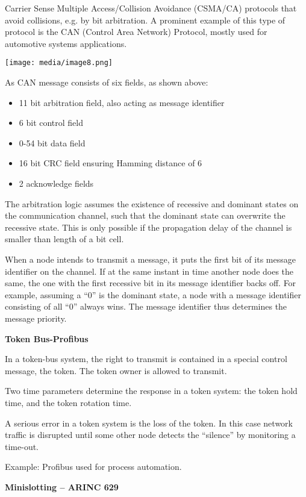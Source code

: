 Carrier Sense Multiple Access/Collision Avoidance (CSMA/CA) protocols
that avoid collisions, e.g. by bit arbitration. A prominent example of
this type of protocol is the CAN (Control Area Network) Protocol, mostly
used for automotive systems applications.

\texttt{[image: media/image8.png]}

As CAN message consists of six fields, as shown above:

\begin{itemize}
\item
  11 bit arbitration field, also acting as message identifier
\item
  6 bit control field
\item
  0-54 bit data field
\item
  16 bit CRC field ensuring Hamming distance of 6
\item
  2 acknowledge fields
\end{itemize}

The arbitration logic assumes the existence of recessive and dominant
states on the communication channel, such that the dominant state can
overwrite the recessive state. This is only possible if the propagation
delay of the channel is smaller than length of a bit cell.

When a node intends to transmit a message, it puts the first bit of its
message identifier on the channel. If at the same instant in time
another node does the same, the one with the first recessive bit in its
message identifier backs off. For example, assuming a ``0'' is the
dominant state, a node with a message identifier consisting of all ``0''
always wins. The message identifier thus determines the message
priority.

\textbf{Token Bus-Profibus}

In a token-bus system, the right to transmit is contained in a special
control message, the token. The token owner is allowed to transmit.

Two time parameters determine the response in a token system: the token
hold time, and the token rotation time.

A serious error in a token system is the loss of the token. In this case
network traffic is disrupted until some other node detects the
``silence'' by monitoring a time-out.

Example: Profibus used for process automation.

\textbf{Minislotting -- ARINC 629}

